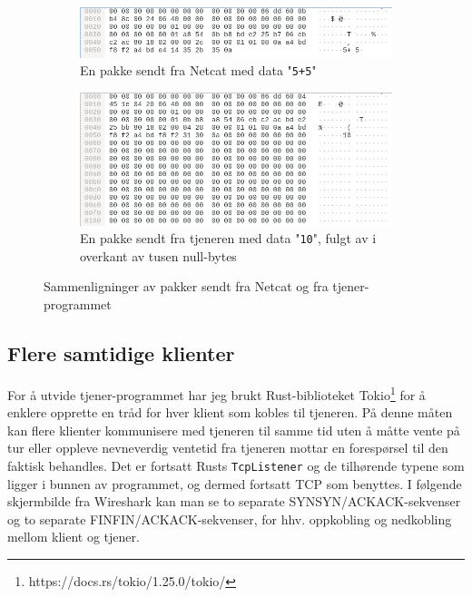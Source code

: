 \documentclass{article}
\begin{document}
\begin{figure}[ht]
    \centering
    \begin{subfigure}[t]{.45\linewidth}
        \centering
        \includegraphics[width=\linewidth]{illustrasjoner/P3-fra-netcat.png}
        \caption{En pakke sendt fra Netcat med data "\texttt{5+5}"}
    \end{subfigure}
    \hfill
    \begin{subfigure}[t]{.45\linewidth}
        \centering
        \includegraphics[width=\linewidth]{illustrasjoner/P3-fra-tjener.png}
        \caption{En pakke sendt fra tjeneren med data "\texttt{10}", fulgt av i overkant av tusen null-bytes}
    \end{subfigure}

    \caption{Sammenligninger av pakker sendt fra Netcat og fra tjener-programmet}
    \label{fig:pakkesammenligning}
\end{figure}

\subsection{Flere samtidige klienter}

For å utvide tjener-programmet har jeg brukt Rust-biblioteket Tokio\footnote{https://docs.rs/tokio/1.25.0/tokio/} for å enklere opprette en tråd for hver klient som kobles til tjeneren. På denne måten kan flere klienter kommunisere med tjeneren til samme tid uten å måtte vente på tur eller oppleve nevneverdig ventetid fra tjeneren mottar en forespørsel til den faktisk behandles. Det er fortsatt Rusts \texttt{TcpListener} og de tilhørende typene som ligger i bunnen av programmet, og dermed fortsatt TCP som benyttes.
I følgende skjermbilde fra Wireshark kan man se to separate SYN\rightarrow SYN/ACK\rightarrow ACK-sekvenser og to separate FIN\rightarrow FIN/ACK\rightarrow ACK-sekvenser, for hhv. oppkobling og nedkobling mellom klient og tjener.
\end{document}

